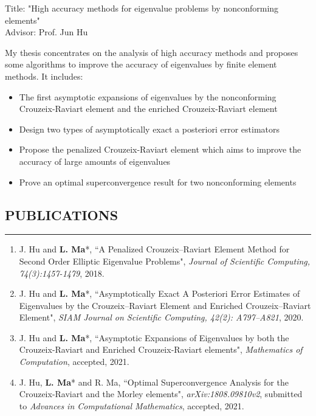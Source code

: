 \documentclass[10pt,a4]{article}
\begin{document}
\begin{small}
\begin{list}{}{}
\item Title: "High accuracy methods for eigenvalue problems by nonconforming elements"  \\
Advisor: Prof. Jun Hu
\item My thesis concentrates on the analysis of high accuracy methods and proposes some algorithms to improve the accuracy of eigenvalues by finite element methods.  It includes:
\begin{itemize}
\item The first asymptotic expansions of eigenvalues by the nonconforming Crouzeix-Raviart element and the enriched Crouzeix-Raviart element 
\item Design two types of asymptotically exact a posteriori error estimators
\item Propose the penalized Crouzeix-Raviart element which aims to improve the accuracy of large amounts of eigenvalues
\item Prove an optimal superconvergence result for two nonconforming elements
\end{itemize}
\end{list}

 
\subsection*{PUBLICATIONS}
\hrule
\vspace{0.2cm} 
\begin{enumerate}
	\item J. Hu and \textbf{L. Ma}*, ``A Penalized Crouzeix--Raviart Element Method for Second Order Elliptic Eigenvalue Problems",  {\it Journal of Scientific Computing, 74(3):1457-1479}, 2018.
	
	\item J. Hu and \textbf{L. Ma}*, ``Asymptotically Exact A Posteriori Error Estimates of Eigenvalues by the Crouzeix--Raviart Element and Enriched Crouzeix--Raviart Element",  {\it SIAM Journal on Scientific Computing, 42(2): A797--A821}, 2020.
	
	\item J. Hu and \textbf{L. Ma}*, ``Asymptotic Expansions of Eigenvalues by both the Crouzeix-Raviart and Enriched Crouzeix-Raviart elements", {\it Mathematics of Computation}, accepted, 2021.

	
	\item J. Hu, \textbf{L. Ma}* and R. Ma, ``Optimal Superconvergence Analysis for the Crouzeix-Raviart and the Morley elements",  {\it arXiv:1808.09810v2}, submitted to {\it Advances in Computational Mathematics}, accepted, 2021.



\end{enumerate}
\end{small}
\end{document}
